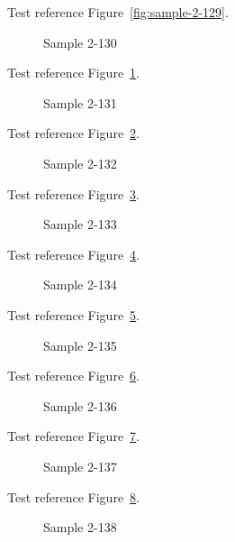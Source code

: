 Test reference Figure~\ref{fig:sample-2-129}.

\begin{figure}[tbhp]
\caption{Sample 2-130}
\label{fig:sample-2-130}
\end{figure}

Test reference Figure~\ref{fig:sample-2-130}.

\begin{figure}[tbhp]
\caption{Sample 2-131}
\label{fig:sample-2-131}
\end{figure}

Test reference Figure~\ref{fig:sample-2-131}.

\begin{figure}[tbhp]
\caption{Sample 2-132}
\label{fig:sample-2-132}
\end{figure}

Test reference Figure~\ref{fig:sample-2-132}.

\begin{figure}[tbhp]
\caption{Sample 2-133}
\label{fig:sample-2-133}
\end{figure}

Test reference Figure~\ref{fig:sample-2-133}.

\begin{figure}[tbhp]
\caption{Sample 2-134}
\label{fig:sample-2-134}
\end{figure}

Test reference Figure~\ref{fig:sample-2-134}.

\begin{figure}[tbhp]
\caption{Sample 2-135}
\label{fig:sample-2-135}
\end{figure}

Test reference Figure~\ref{fig:sample-2-135}.

\begin{figure}[tbhp]
\caption{Sample 2-136}
\label{fig:sample-2-136}
\end{figure}

Test reference Figure~\ref{fig:sample-2-136}.

\begin{figure}[tbhp]
\caption{Sample 2-137}
\label{fig:sample-2-137}
\end{figure}

Test reference Figure~\ref{fig:sample-2-137}.

\begin{figure}[tbhp]
\caption{Sample 2-138}
\label{fig:sample-2-138}
\end{figure}

